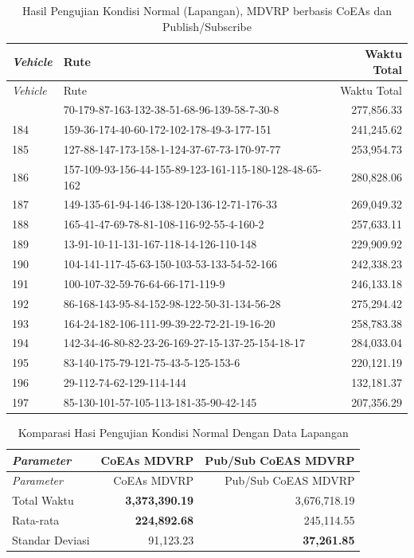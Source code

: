 \begin{longtable}[!]{lp{8cm}r}
	\caption{Hasil Pengujian Kondisi Normal (Lapangan), MDVRP berbasis CoEAs dan Publish/Subscribe}
	\label{tbl:test_result_normal_field_pubsub_coes}\\
	\toprule
		\textit{Vehicle} & Rute & Waktu Total\\ 
	\midrule
	\endfirsthead
	\toprule
		\textit{Vehicle} & Rute & Waktu Total\\ 
	\midrule
	\endhead
	\bottomrule
	\endfoot
		183 & 70-179-87-163-132-38-51-68-96-139-58-7-30-8 & 277,856.33 \\
		184 & 159-36-174-40-60-172-102-178-49-3-177-151 & 241,245.62 \\
		185 & 127-88-147-173-158-1-124-37-67-73-170-97-77 & 253,954.73 \\
		186 & 157-109-93-156-44-155-89-123-161-115-180-128-48-65-162 & 280,828.06 \\
		187 & 149-135-61-94-146-138-120-136-12-71-176-33 & 269,049.32 \\
		188 & 165-41-47-69-78-81-108-116-92-55-4-160-2 & 257,633.11 \\
		189 & 13-91-10-11-131-167-118-14-126-110-148 & 229,909.92 \\
		190 & 104-141-117-45-63-150-103-53-133-54-52-166 & 242,338.23 \\
		191 & 100-107-32-59-76-64-66-171-119-9 & 246,133.18 \\
		192 & 86-168-143-95-84-152-98-122-50-31-134-56-28 & 275,294.42 \\
		193 & 164-24-182-106-111-99-39-22-72-21-19-16-20 & 258,783.38 \\
		194 & 142-34-46-80-82-23-26-169-27-15-137-25-154-18-17 & 284,033.04 \\
		195 & 83-140-175-79-121-75-43-5-125-153-6 & 220,121.19 \\
		196 & 29-112-74-62-129-114-144 & 132,181.37 \\
		197 & 85-130-101-57-105-113-181-35-90-42-145 & 207,356.29 \\
\end{longtable}


\begin{longtable}[!]{lrr}
	\caption{Komparasi Hasi Pengujian Kondisi Normal Dengan Data Lapangan}
	\label{tbl:test_result_normal_field_comparison}\\
	\toprule
	\textit{Parameter} & CoEAs MDVRP  & Pub/Sub CoEAS MDVRP\\ 
	\midrule
	\endfirsthead
	\toprule
	\textit{Parameter} & CoEAs MDVRP  & Pub/Sub CoEAS MDVRP\\ 
	\midrule
	\endhead
	\bottomrule
	\endfoot
		Total Waktu & \textbf{3,373,390.19} & 3,676,718.19\\
		Rata-rata & \textbf{224,892.68} & 245,114.55\\
		Standar Deviasi & 91,123.23 & \textbf{37,261.85}\\
\end{longtable}


